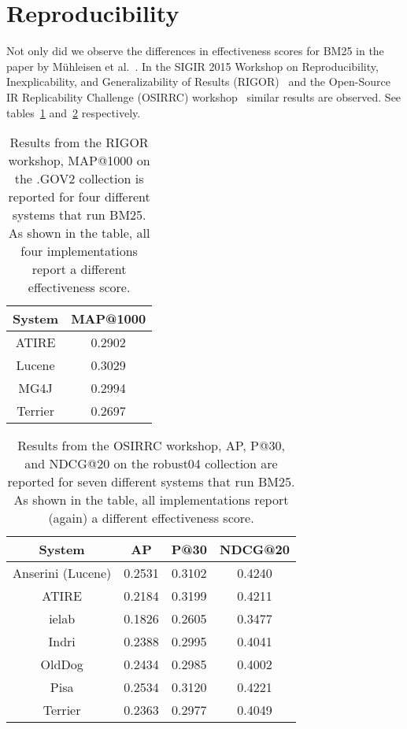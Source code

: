 \section{Reproducibility}
Not only did we observe the differences in effectiveness scores for BM25 in the paper by M\"{u}hleisen et al.~\cite{OldDog}. In the SIGIR 2015 Workshop on Reproducibility, Inexplicability, and Generalizability of Results (RIGOR)~\cite{RIGOR} and the Open-Source IR Replicability Challenge (OSIRRC) workshop~\cite{OSIRRC} similar results are observed. See tables~\ref{rigor_results} and~\ref{osirrc_results} respectively.  

\begin{table}
	\centering
	\caption{Results from the RIGOR workshop\cite{RIGOR}, MAP@1000 on the .GOV2 collection is reported for four different systems that run BM25. As shown in the table, all four implementations report a different effectiveness score.}
	\label{rigor_results}
	\begin{tabular}{c c}
		\toprule
		System &  MAP@1000 \\
		\midrule
		ATIRE & 0.2902 \\
		Lucene & 0.3029 \\
		MG4J & 0.2994 \\
		Terrier & 0.2697 \\
		\bottomrule
	\end{tabular}
\end{table}


\begin{table}
	\centering
	\caption{Results from the OSIRRC workshop\cite{OSIRRC}, AP, P@30, and NDCG@20 on the robust04 collection are reported for seven different systems that run BM25. As shown in the table, all implementations report (again) a different effectiveness score.}
	\label{osirrc_results}
	\begin{tabular}{c c c c}
		\toprule
		System & AP & P@30 & NDCG@20 \\
		\midrule
		Anserini (Lucene) & 0.2531 & 0.3102 & 0.4240 \\
		ATIRE & 0.2184 & 0.3199 & 0.4211 \\
		ielab & 0.1826 & 0.2605 & 0.3477 \\
		Indri & 0.2388 & 0.2995 & 0.4041 \\
		OldDog & 0.2434 & 0.2985 & 0.4002 \\
		Pisa & 0.2534 & 0.3120 & 0.4221 \\
		Terrier & 0.2363 & 0.2977 & 0.4049 \\
		\bottomrule
	\end{tabular}
\end{table}

